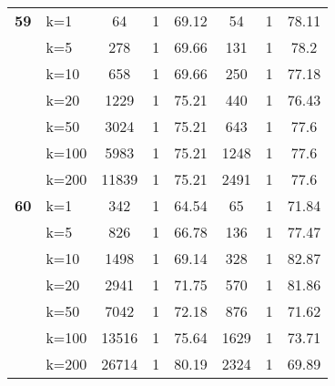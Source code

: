\begin{table}[htbp]
\begin{tabular}{|l|l|c|c|c|c|c|c|}
    \multicolumn{1}{|r|}{\textbf{59}} & k=1 & 64 & 1 & 69.12 & 54 & 1 & 78.11 \\ 
     & k=5 & 278 & 1 & 69.66 & 131 & 1 & 78.2 \\ 
     & k=10 & 658 & 1 & 69.66 & 250 & 1 & 77.18 \\ 
     & k=20 & 1229 & 1 & 75.21 & 440 & 1 & 76.43 \\ 
     & k=50 & 3024 & 1 & 75.21 & 643 & 1 & 77.6 \\ 
     & k=100 & 5983 & 1 & 75.21 & 1248 & 1 & 77.6 \\ 
     & k=200 & 11839 & 1 & 75.21 & 2491 & 1 & 77.6 \\ \hline
    \multicolumn{1}{|r|}{\textbf{60}} & k=1 & 342 & 1 & 64.54 & 65 & 1 & 71.84 \\ 
     & k=5 & 826 & 1 & 66.78 & 136 & 1 & 77.47 \\ 
     & k=10 & 1498 & 1 & 69.14 & 328 & 1 & 82.87 \\ 
     & k=20 & 2941 & 1 & 71.75 & 570 & 1 & 81.86 \\ 
     & k=50 & 7042 & 1 & 72.18 & 876 & 1 & 71.62 \\ 
     & k=100 & 13516 & 1 & 75.64 & 1629 & 1 & 73.71 \\ 
     & k=200 & 26714 & 1 & 80.19 & 2324 & 1 & 69.89 \\ \hline
    \end{tabular}
\end{table}
